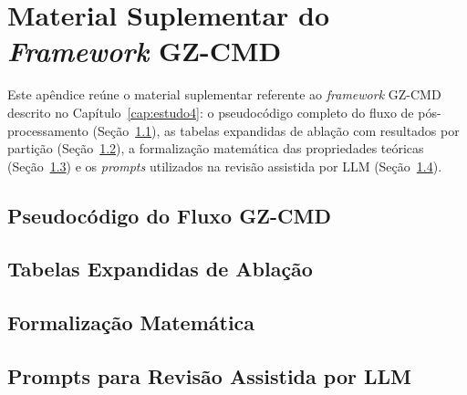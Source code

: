 \chapter{Material Suplementar do \textit{Framework} GZ-CMD}
\label{apendice:material-suplementar}

Este apêndice reúne o material suplementar referente ao \textit{framework} GZ-CMD descrito no Capítulo~\ref{cap:estudo4}: o pseudocódigo completo do fluxo de pós-processamento (Seção~\ref{sec:apendice-algoritmo}), as tabelas expandidas de ablação com resultados por partição (Seção~\ref{sec:apendice-ablacao}), a formalização matemática das propriedades teóricas (Seção~\ref{sec:apendice-formalizacao}) e os \textit{prompts} utilizados na revisão assistida por LLM (Seção~\ref{sec:apendice-prompts}).

\section{Pseudocódigo do Fluxo GZ-CMD}
\label{sec:apendice-algoritmo}


\section{Tabelas Expandidas de Ablação}
\label{sec:apendice-ablacao}


\section{Formalização Matemática}
\label{sec:apendice-formalizacao}


\section{Prompts para Revisão Assistida por LLM}
\label{sec:apendice-prompts}

